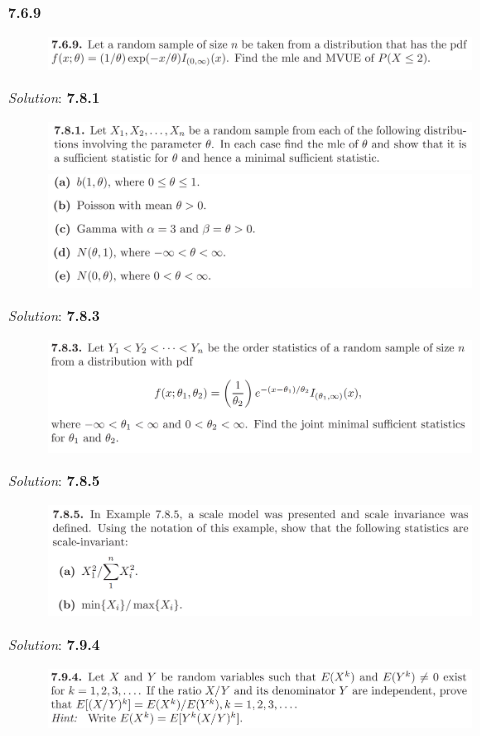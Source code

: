 \documentclass{book}
\theoremstyle{definition}
\begin{document}
\newpage
\noindent\textbf{7.6.9}
\begin{figure}[!htb]
	\centering
	\includegraphics[scale=0.5]{769}
\end{figure}

\noindent\textit{Solution}:
\newpage
\noindent\textbf{7.8.1}
\begin{figure}[!htb]
	\centering
	\includegraphics[scale=0.5]{781a}
	\includegraphics[scale=0.5]{781b}
\end{figure}


\noindent\textit{Solution}:
\newpage
\noindent\textbf{7.8.3}
\begin{figure}[!htb]
	\centering
	\includegraphics[scale=0.5]{783}
\end{figure}


\noindent\textit{Solution}:
\newpage
\noindent\textbf{7.8.5}
\begin{figure}[!htb]
	\centering
	\includegraphics[scale=0.5]{785}
\end{figure}


\noindent\textit{Solution}:
\newpage
\noindent\textbf{7.9.4}
\begin{figure}[!htb]
	\centering
	\includegraphics[scale=0.5]{794}
\end{figure}
\end{document}
